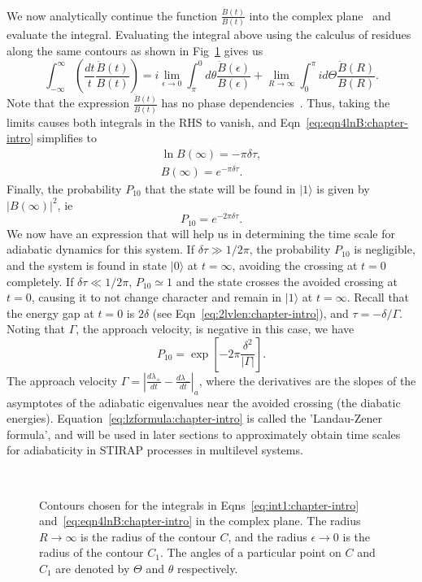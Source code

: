 We now analytically continue the function $\frac{\ddot{B}(t)}{B(t)}$ into the complex plane~\cite{wittig:lzformula} and evaluate the integral. Evaluating the integral above  using the calculus of residues along the same contours as shown in Fig~\ref{fig:contours:chapter-intro} gives us
\begin{equation}
 \int^\infty_{-\infty} \left( \frac{dt}{t} \frac{\ddot{B}(t)}{B(t)}\right) =i \lim_{\epsilon \to 0} \int^0_\pi d\theta \frac{\ddot{B}(\epsilon)}{B(\epsilon)} + \lim_{R \to \infty} \int^\pi_0 i d\Theta \frac{\ddot{B}(R)}{B(R)}.
 \end{equation}
Note that the expression $\frac{\ddot{B}(t)}{B(t)}$ has no phase dependencies~\cite{wittig:lzformula}. Thus, taking the limits causes both integrals in the RHS to vanish, and Eqn~\ref{eq:eqn4lnB:chapter-intro} simplifies to 
\begin{eqnarray}
\ln B(\infty) = -\pi \delta \tau, \nonumber \\
B(\infty) = e^{-\pi \delta \tau}.
\end{eqnarray}
Finally, the probability $P_{10}$ that the state will be found in $|1\rangle$ is given by $|B(\infty)|^2$, ie
\begin{equation}
P_{10}=e^{-2\pi \delta \tau}.
\end{equation}
We now have an expression that will help us in determining the time scale for adiabatic dynamics for this system. If $\delta \tau \gg 1/2\pi$, the probability $P_{10}$ is negligible, and the system is found in state $|0 \rangle$ at $t=\infty$, avoiding the crossing at $t=0$ completely. If $\delta \tau \ll 1/2\pi$, $P_{10} \simeq 1$ and the state crosses the avoided crossing at $t=0$, causing it to not change character and remain in $|1\rangle$ at $t=\infty$. Recall that the energy gap at $t=0$ is $2 \delta$ (see Eqn~\ref{eq:2lvlen:chapter-intro}), and $\tau=-\delta/\Gamma$. Noting that $\Gamma$, the approach velocity, is negative in this case, we have
\begin{equation}
P_{10}=\exp{\left[ -2\pi\frac{\delta^2}{|\Gamma|}\right]}.
\label{eq:lzformula:chapter-intro}
\end{equation}
The approach velocity $\Gamma=|\frac{d\lambda_+}{dt}-\frac{d\lambda_-}{dt}|_a$, where the derivatives are the slopes of the asymptotes of the adiabatic eigenvalues near the avoided crossing (the diabatic energies). Equation~\ref{eq:lzformula:chapter-intro} is called the 'Landau-Zener formula', and will be used in later sections to approximately obtain time scales for adiabaticity in STIRAP processes in multilevel systems.
\begin{figure}
\ 
\caption{Contours chosen for the integrals in Eqns~\ref{eq:int1:chapter-intro} and~\ref{eq:eqn4lnB:chapter-intro} in the complex plane. The radius $R \rightarrow \infty$ is the radius of the contour $C$, and the radius $\epsilon \rightarrow 0$ is the radius of the contour $C_1$. The angles of a particular point on $C$ and $C_1$ are denoted by $\Theta$ and $\theta$ respectively.}
\label{fig:contours:chapter-intro}
\end{figure}

